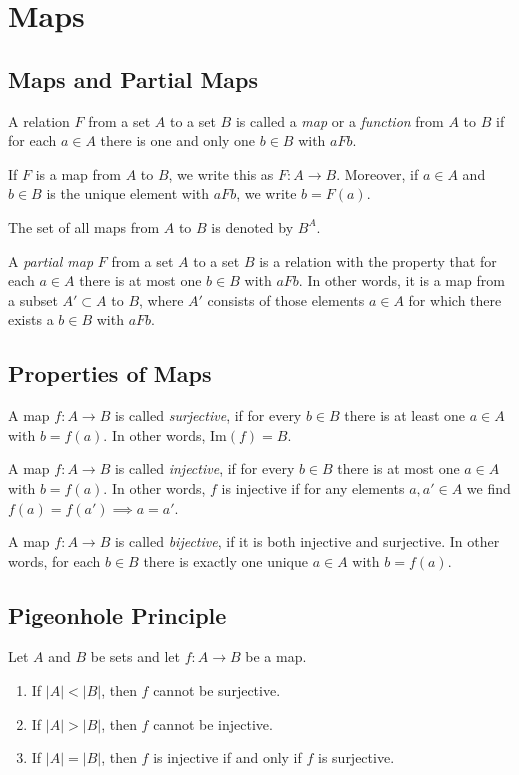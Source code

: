 \documentclass[fleqn]{article}
\begin{document}
\section{Maps}
\subsection{Maps and Partial Maps}
A relation $F$ from a set $A$ to a set $B$ is called a \textit{map} or a \textit{function}
from $A$ to $B$ if for each $a \in A$ there is one and only one $b \in B$ with $aFb$.

If $F$ is a map from $A$ to $B$, we write this as $F \colon A \to B$. Moreover, if
$a \in A$ and $b \in B$ is the unique element with $aFb$, we write $b = F(a)$.

The set of all maps from $A$ to $B$ is denoted by $B^A$.

A \textit{partial map} $F$ from a set $A$ to a set $B$ is a relation with the property
that for each $a \in A$ there is at most one $b \in B$ with $aFb$. In other words,
it is a map from a subset $A' \subset A$ to $B$, where $A'$ consists of those elements
$a \in A$ for which there exists a $b \in B$ with $aFb$.

\subsection{Properties of Maps}
A map $f:A \to B$ is called \textit{surjective}, if for every $b \in B$ there is
at least one $a \in A$ with $b = f(a)$. In other words, $\text{Im}(f) = B$.

A map $f:A \to B$ is called \textit{injective}, if for every $b \in B$ there is
at most one  $a \in A$ with $b = f(a)$. In other words, $f$ is injective if for any
elements $a,a' \in A$ we find $f(a) = f(a') \implies a = a'$.

A map $f:A \to B$ is called \textit{bijective}, if it is both injective and surjective.
In other words, for each $b \in B$ there is exactly one unique $a \in A$ with $b = f(a)$.

\subsection{Pigeonhole Principle}
Let $A$ and $B$ be sets and let $f:A \to B$ be
a map.
\begin{enumerate}
    \item If $|A| < |B|$, then $f$ cannot be surjective.
    \item If $|A| > |B|$, then $f$ cannot be injective.
    \item If $|A| = |B|$, then $f$ is injective if and only if $f$ is surjective.
\end{enumerate}
\end{document}
